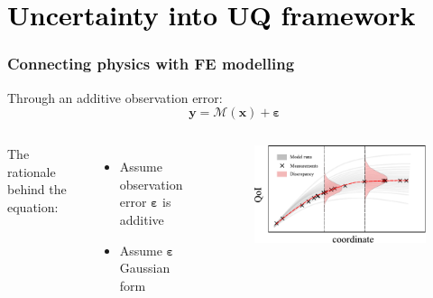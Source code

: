 
\section{\textcolor{black}{Uncertainty into UQ framework}}
\begin{frame}\frametitle{Connecting physics with FE modelling}
\begin{block}{Through an additive observation error:}
  \begin{equation}
 \label{eq: modelling_discrepancy}
 \boldsymbol{y} = \mathcal{M}(\boldsymbol{x}) + \boldsymbol{\varepsilon}
\end{equation}  
\end{block}
\begin{columns}
The rationale behind the equation:
\begin{itemize}
    \item Assume observation error $\boldsymbol{\varepsilon}$ is additive
    \item Assume $\boldsymbol{\varepsilon}$ Gaussian form
\end{itemize}
\begin{figure}[!ht]       
\includegraphics[scale=0.8]{figures/figure-likelihood.pdf}
\end{figure}
\end{columns}
 
\end{frame}
